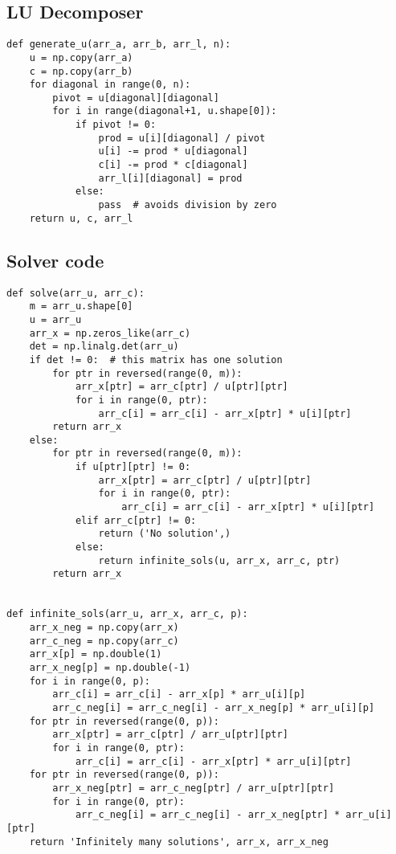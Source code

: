 \documentclass{article}
\begin{document}
\subsection{LU Decomposer}
\label{lu}
\begin{verbatim}
def generate_u(arr_a, arr_b, arr_l, n):
    u = np.copy(arr_a)
    c = np.copy(arr_b)
    for diagonal in range(0, n):
        pivot = u[diagonal][diagonal]
        for i in range(diagonal+1, u.shape[0]):
            if pivot != 0:
                prod = u[i][diagonal] / pivot
                u[i] -= prod * u[diagonal]
                c[i] -= prod * c[diagonal]
                arr_l[i][diagonal] = prod
            else:
                pass  # avoids division by zero
    return u, c, arr_l
\end{verbatim}
\subsection{Solver code}
\label{solver}
\begin{verbatim}
def solve(arr_u, arr_c):
    m = arr_u.shape[0]
    u = arr_u
    arr_x = np.zeros_like(arr_c)
    det = np.linalg.det(arr_u)
    if det != 0:  # this matrix has one solution
        for ptr in reversed(range(0, m)):
            arr_x[ptr] = arr_c[ptr] / u[ptr][ptr]
            for i in range(0, ptr):
                arr_c[i] = arr_c[i] - arr_x[ptr] * u[i][ptr]
        return arr_x
    else:
        for ptr in reversed(range(0, m)):
            if u[ptr][ptr] != 0:
                arr_x[ptr] = arr_c[ptr] / u[ptr][ptr]
                for i in range(0, ptr):
                    arr_c[i] = arr_c[i] - arr_x[ptr] * u[i][ptr]
            elif arr_c[ptr] != 0:
                return ('No solution',)
            else:
                return infinite_sols(u, arr_x, arr_c, ptr)
        return arr_x


def infinite_sols(arr_u, arr_x, arr_c, p):
    arr_x_neg = np.copy(arr_x)
    arr_c_neg = np.copy(arr_c)
    arr_x[p] = np.double(1)
    arr_x_neg[p] = np.double(-1)
    for i in range(0, p):
        arr_c[i] = arr_c[i] - arr_x[p] * arr_u[i][p]
        arr_c_neg[i] = arr_c_neg[i] - arr_x_neg[p] * arr_u[i][p]
    for ptr in reversed(range(0, p)):
        arr_x[ptr] = arr_c[ptr] / arr_u[ptr][ptr]
        for i in range(0, ptr):
            arr_c[i] = arr_c[i] - arr_x[ptr] * arr_u[i][ptr]
    for ptr in reversed(range(0, p)):
        arr_x_neg[ptr] = arr_c_neg[ptr] / arr_u[ptr][ptr]
        for i in range(0, ptr):
            arr_c_neg[i] = arr_c_neg[i] - arr_x_neg[ptr] * arr_u[i][ptr]
    return 'Infinitely many solutions', arr_x, arr_x_neg
\end{verbatim}
\end{document}
